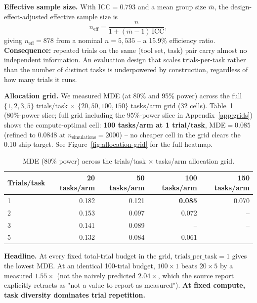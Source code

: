 \documentclass[11pt]{article}
\begin{document}
\textbf{Effective sample size.} With $\mathrm{ICC}=0.793$ and a mean group size $\bar m$, the
design-effect-adjusted \citep{kish1965survey} effective sample size is
\[
n_{\mathrm{eff}} = \frac{n}{1 + (\bar m - 1)\,\mathrm{ICC}},
\]
giving $n_{\mathrm{eff}}=878$ from a nominal $n=5{,}535$ -- a 15.9\% efficiency ratio.
\textbf{Consequence:} repeated trials on the same (tool set, task) pair carry almost no
independent information. An evaluation design that scales trials-per-task rather than the number
of distinct tasks is underpowered by construction, regardless of how many trials it runs.

\textbf{Allocation grid.} We measured MDE (at 80\% and 95\% power) across the full $\{1,2,3,5\}$
trials/task $\times$ $\{20,50,100,150\}$ tasks/arm grid (32 cells).
Table~\ref{tab:allocation} (80\%-power slice; full grid including the 95\%-power slice in
Appendix~\ref{app:grids}) shows the compute-optimal cell: \textbf{100 tasks/arm at 1
trial/task}, MDE$=0.085$ (refined to 0.0848 at $n_{\text{simulations}}=2000$) -- no cheaper cell in
the grid clears the 0.10 ship target. See Figure~\ref{fig:allocation-grid} for the full heatmap.

\begin{table}[htbp]
\centering
\caption{MDE (80\% power) across the trials/task $\times$ tasks/arm allocation grid.
\label{tab:allocation}}
\begin{tabular}{lrrrr}
\toprule
Trials/task & 20 tasks/arm & 50 tasks/arm & 100 tasks/arm & 150 tasks/arm \\
\midrule
1 & 0.182 & 0.121 & \textbf{0.085} & 0.070 \\
2 & 0.153 & 0.097 & 0.072 & -- \\
3 & 0.141 & 0.089 & -- & -- \\
5 & 0.132 & 0.084 & 0.061 & -- \\
\bottomrule
\end{tabular}
\end{table}

\textbf{Headline.} At every fixed total-trial budget in the grid, $\mathrm{trials\_per\_task}=1$
gives the lowest MDE. At an identical 100-trial budget, $100\times1$ beats $20\times5$ by a
measured $1.55\times$ (not the naively predicted $2.04\times$, which the source report explicitly
retracts as "not a value to report as measured").
\textbf{At fixed compute, task diversity dominates trial repetition.}
\end{document}
